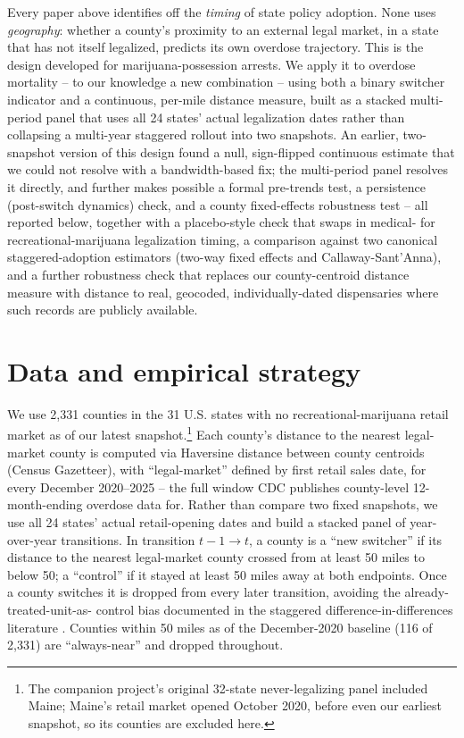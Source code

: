 \documentclass[11pt]{article}
\begin{document}
Every paper above identifies off the \emph{timing} of state policy
adoption. None uses \emph{geography}: whether a county's proximity to
an external legal market, in a state that has not itself legalized,
predicts its own overdose trajectory. This is the design
\citet{HaoCowan2020} developed for marijuana-possession arrests. We
apply it to overdose mortality -- to our knowledge a new combination --
using both a binary switcher indicator and a continuous, per-mile
distance measure, built as a stacked multi-period panel that uses all
24 states' actual legalization dates rather than collapsing a
multi-year staggered rollout into two snapshots. An earlier,
two-snapshot version of this design found a null, sign-flipped
continuous estimate that we could not resolve with a bandwidth-based
fix; the multi-period panel resolves it directly, and further makes
possible a formal pre-trends test, a persistence (post-switch
dynamics) check, and a county fixed-effects robustness test -- all
reported below, together with a placebo-style check that swaps in
medical- for recreational-marijuana legalization timing, a comparison
against two canonical staggered-adoption estimators (two-way fixed
effects and Callaway-Sant'Anna), and a further robustness check that
replaces our county-centroid distance measure with distance to real,
geocoded, individually-dated dispensaries where such records are
publicly available.

\section{Data and empirical strategy}

We use 2,331 counties in the 31 U.S. states with no
recreational-marijuana retail market as of our latest
snapshot.\footnote{The companion project's original 32-state
never-legalizing panel included Maine; Maine's retail market opened
October 2020, before even our earliest snapshot, so its counties are
excluded here.} Each county's distance to the nearest legal-market
county is computed via Haversine distance between county centroids
(Census Gazetteer), with ``legal-market'' defined by first retail
sales date, for every December 2020--2025 -- the full window CDC
publishes county-level 12-month-ending overdose data for. Rather than
compare two fixed snapshots, we use all 24 states' actual
retail-opening dates and build a stacked panel of year-over-year
transitions. In transition $t-1\to t$, a county is a ``new switcher''
if its distance to the nearest legal-market county crossed from at
least 50 miles to below 50; a ``control'' if it stayed at least 50
miles away at both endpoints. Once a county switches it is dropped
from every later transition, avoiding the already-treated-unit-as-
control bias documented in the staggered difference-in-differences
literature \citep{GoodmanBacon2021}. Counties within 50 miles as of
the December-2020 baseline (116 of 2,331) are ``always-near'' and
dropped throughout.
\end{document}

